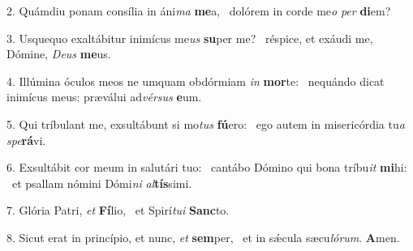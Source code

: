 2. Quámdiu ponam consília in áni\textit{ma} \textbf{me}a, \ast\  dolórem in corde me\textit{o} \textit{per} \textbf{di}em?\

3. Usquequo exaltábitur inimícus me\textit{us} \textbf{su}per me? \ast\  réspice, et exáudi me, Dómine, \textit{De}\textit{us} \textbf{me}us.\

4. Illúmina óculos meos ne umquam obdórmiam \textit{in} \textbf{mor}te: \ast\  nequándo dicat inimícus meus: præválui ad\textit{vér}\textit{sus} \textbf{e}um.\

5. Qui tríbulant me, exsultábunt si mo\textit{tus} \textbf{fú}ero: \ast\  ego autem in misericórdia tu\textit{a} \textit{spe}\textbf{rá}vi.\

6. Exsultábit cor meum in salutári tuo: \dag\  cantábo Dómino qui bona tríbu\textit{it} \textbf{mi}hi: \ast\  et psallam nómini Dómi\textit{ni} \textit{al}\textbf{tís}simi.\

7. Glória Patri, \textit{et} \textbf{Fí}lio, \ast\  et Spirí\textit{tu}\textit{i} \textbf{Sanc}to.\

8. Sicut erat in princípio, et nunc, \textit{et} \textbf{sem}per, \ast\  et in sǽcula sæcu\textit{ló}\textit{rum}. \textbf{A}men.\

